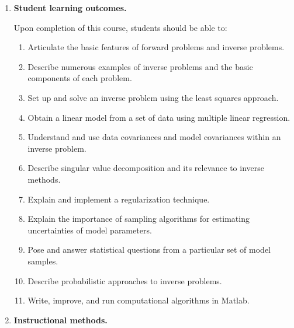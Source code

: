 \documentclass[10pt,titlepage,fleqn]{article}
\begin{document}
\begin{enumerate}

\item {\bf Student learning outcomes.}

Upon completion of this course, students should be able to:
%
\begin{enumerate}
\item Articulate the basic features of forward problems and inverse problems.
\item Describe numerous examples of inverse problems and the basic components of each problem.
\item Set up and solve an inverse problem using the least squares approach.
\item Obtain a linear model from a set of data using multiple linear regression.
\item Understand and use data covariances and model covariances within an inverse problem.
\item Describe singular value decomposition and its relevance to inverse methods.
\item Explain and implement a regularization technique.
\item Explain the importance of sampling algorithms for estimating uncertainties of model parameters.
\item Pose and answer statistical questions from a particular set of model samples.
\item Describe probabilistic approaches to inverse problems.
\item Write, improve, and run computational algorithms in Matlab.
\end{enumerate}

\item {\bf Instructional methods.}


\end{enumerate}
\end{document}
